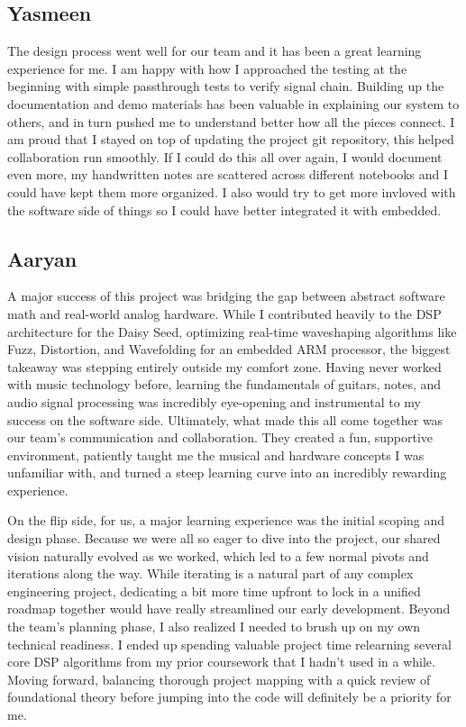 \documentclass[12pt]{article}
\begin{document}
\subsection*{Yasmeen}
The design process went well for our team and it has been a great learning experience for me. I am happy with how I approached the testing at the beginning with simple passthrough tests to verify signal chain. Building up the documentation and demo materials has been valuable in explaining our system to others, and in turn pushed me to understand better how all the pieces connect. I am proud that I stayed on top of updating the project git repository, this helped collaboration run smoothly. If I could do this all over again, I would document even more, my handwritten notes are scattered across different notebooks and I could have kept them more organized. I also would try to get more invloved with the software side of things so I could have better integrated it with embedded. 

\subsection*{Aaryan}
A major success of this project was bridging the gap between abstract software math and real-world analog hardware. While I contributed heavily to the DSP architecture for the Daisy Seed, optimizing real-time waveshaping algorithms like Fuzz, Distortion, and Wavefolding for an embedded ARM processor, the biggest takeaway was stepping entirely outside my comfort zone. Having never worked with music technology before, learning the fundamentals of guitars, notes, and audio signal processing was incredibly eye-opening and instrumental to my success on the software side. Ultimately, what made this all come together was our team's communication and collaboration. They created a fun, supportive environment, patiently taught me the musical and hardware concepts I was unfamiliar with, and turned a steep learning curve into an incredibly rewarding experience.

On the flip side, for us, a major learning experience was the initial scoping and design phase. Because we were all so eager to dive into the project, our shared vision naturally evolved as we worked, which led to a few normal pivots and iterations along the way. While iterating is a natural part of any complex engineering project, dedicating a bit more time upfront to lock in a unified roadmap together would have really streamlined our early development. Beyond the team's planning phase, I also realized I needed to brush up on my own technical readiness. I ended up spending valuable project time relearning several core DSP algorithms from my prior coursework that I hadn't used in a while. Moving forward, balancing thorough project mapping with a quick review of foundational theory before jumping into the code will definitely be a priority for me.
\end{document}
